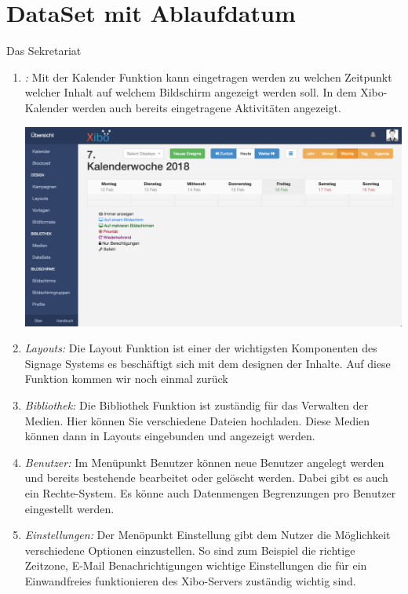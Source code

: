 \section{DataSet mit Ablaufdatum}\label{sec:datasetexpiredate}
Das Sekretariat 

\begin{enumerate}
	\item {\em :} Mit der Kalender Funktion kann eingetragen werden zu welchen Zeitpunkt welcher Inhalt auf welchem Bildschirm angezeigt werden soll. In dem Xibo-Kalender werden auch bereits eingetragene Aktivitäten angezeigt.

\begin{calendar}
	\centering
\includegraphics[width=1\textwidth]{images/xibo-basics-calendar}
	\label{Calendar}
\end{calendar}	
	
	\item {\em Layouts:} 
	Die Layout Funktion ist einer der wichtigsten Komponenten des Signage Systems es beschäftigt sich mit dem designen der Inhalte. Auf diese Funktion kommen wir noch einmal zurück
	
	\item {\em Bibliothek:} 
	Die Bibliothek Funktion ist zuständig für das Verwalten der Medien. Hier können Sie verschiedene Dateien hochladen.  Diese Medien können dann in Layouts eingebunden und angezeigt werden.
	
	\item {\em Benutzer:} 
	Im Menüpunkt Benutzer können neue Benutzer angelegt werden und bereits bestehende bearbeitet oder gelöscht werden. Dabei gibt es auch ein Rechte-System. Es könne auch Datenmengen Begrenzungen pro Benutzer eingestellt werden.
	
	\item {\em Einstellungen:} 
	Der Menöpunkt Einstellung gibt dem Nutzer die Möglichkeit verschiedene Optionen einzustellen. So sind zum Beispiel die richtige Zeitzone, E-Mail Benachrichtigungen wichtige Einstellungen die für ein Einwandfreies funktionieren des Xibo-Servers zuständig wichtig sind.
\end{enumerate}


